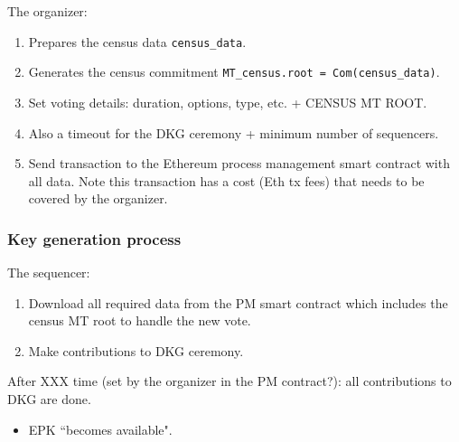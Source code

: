 The organizer:
\begin{enumerate}
	\item Prepares the census data \texttt{census\_data}.
	\item Generates the census commitment \texttt{MT\_census.root = Com(census\_data)}.
	\item Set voting details: duration, options, type, etc. + CENSUS MT ROOT.
	\item Also a timeout for the DKG ceremony + minimum number of sequencers.
	\item Send transaction to the Ethereum process management smart contract with all data. Note this transaction has a cost (Eth tx fees) that needs to be covered by the organizer.
\end{enumerate}

\subsubsection{Key generation process} %
\label{sec:vocdoni-protocol:dkg}

The sequencer:
\begin{enumerate}
	\item Download all required data from the PM smart contract which includes the census MT root to handle the new vote.
	\item Make contributions to DKG ceremony.
\end{enumerate}

After XXX time (set by the organizer in the PM contract?): all contributions to DKG are done.

	
\begin{itemize}
	\item EPK ``becomes available".
\end{itemize}

